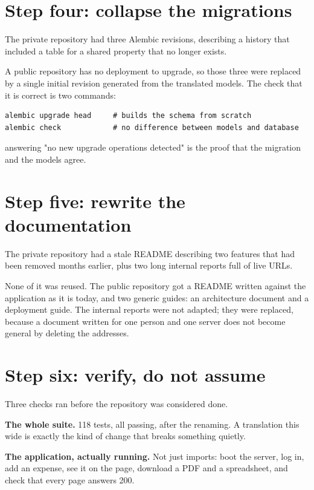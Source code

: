 \section{Step four: collapse the migrations}

The private repository had three Alembic revisions, describing a history that
included a table for a shared property that no longer exists.

A public repository has no deployment to upgrade, so those three were replaced
by a single initial revision generated from the translated models. The check
that it is correct is two commands:

\begin{lstlisting}[style=sh]
alembic upgrade head     # builds the schema from scratch
alembic check            # no difference between models and database
\end{lstlisting}

 answering "no new upgrade operations detected" is the proof
that the migration and the models agree.

\section{Step five: rewrite the documentation}

The private repository had a stale README describing two features that had been
removed months earlier, plus two long internal reports full of live URLs.

None of it was reused. The public repository got a README written against the
application as it is today, and two generic guides: an architecture document and
a deployment guide. The internal reports were not adapted; they were replaced,
because a document written for one person and one server does not become general
by deleting the addresses.

\section{Step six: verify, do not assume}

Three checks ran before the repository was considered done.

\textbf{The whole suite.} 118 tests, all passing, after the renaming. A
translation this wide is exactly the kind of change that breaks something
quietly.

\textbf{The application, actually running.} Not just imports: boot the server,
log in, add an expense, see it on the page, download a PDF and a spreadsheet,
and check that every page answers 200.

